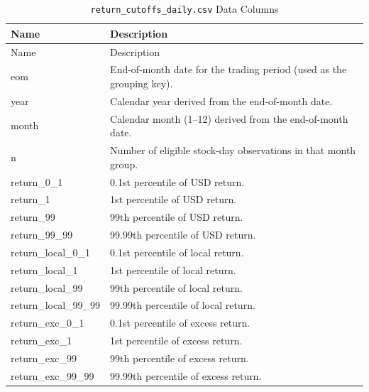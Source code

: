 \documentclass[12pt,title,fleqn]{article}
\begin{document}
{\scriptsize
	\begin{longtable}{@{\extracolsep{\fill}}|l|m{14.2cm}|@{}}
	\caption{\texttt{return\_cutoffs\_daily.csv} Data Columns \label{return-cutoffs-daily}}\\
	
	\hline
	Name & Description \\
	\hline
	\endfirsthead
	
	\hline
	Name & Description \\
	\hline
	\endhead
	
	\hline
	\endfoot
	
	
	\hline\hline
	\endlastfoot
    
    eom\rule{0pt}{10pt} & End-of-month date for the trading period (used as the grouping key). \\[1ex]

    year & Calendar year derived from the end-of-month date. \\[1ex]

    month & Calendar month (1--12) derived from the end-of-month date. \\[1ex]

    n & Number of eligible stock-day observations in that month group. \\[1ex]

    return\_0\_1 & 0.1st percentile of USD return. \\[1ex]

    return\_1 & 1st percentile of USD return. \\[1ex]
    
    return\_99 & 99th percentile of USD return. \\[1ex]

    return\_99\_99 & 99.99th percentile of USD return. \\[1ex]

    return\_local\_0\_1 & 0.1st percentile of local return. \\[1ex]

    return\_local\_1 & 1st percentile of local return. \\[1ex]
    
    return\_local\_99 & 99th percentile of local return. \\[1ex]

    return\_local\_99\_99 & 99.99th percentile of local return. \\[1ex]

    return\_exc\_0\_1 & 0.1st percentile of excess return. \\[1ex]

    return\_exc\_1 & 1st percentile of excess return. \\[1ex]
    
    return\_exc\_99 & 99th percentile of excess return. \\[1ex]

    return\_exc\_99\_99 & 99.99th percentile of excess return. \\[1ex]

\end{longtable}}
\end{document}

